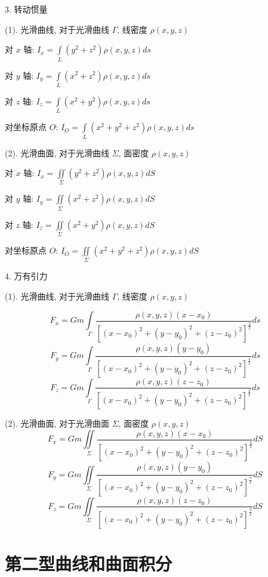 3. \textcolor{purplea}{转动惯量}
\begin{definition}[转动惯量: $I=mr^2$]
	
	(1). 光滑曲线, 对于光滑曲线 $\Gamma$, 线密度 $\rho(x,y,z)$
	
	对 $x$ 轴: $I_{x}=\int\limits_{L}(y^2+z^2)\rho(x,y,z)ds$
	
	对 $y$ 轴: $I_{y}=\int\limits_{L}(x^2+z^2)\rho(x,y,z)ds$
	
	对 $z$ 轴: $I_{z}=\int\limits_{L}(x^2+y^2)\rho(x,y,z)ds$
	
	对坐标原点 $O$: $I_{O}=\int\limits_{L}(x^2+y^2+z^2)\rho(x,y,z)ds$
	
	(2). 光滑曲面, 对于光滑曲线 $\Sigma$, 面密度 $\rho(x,y,z)$
	
	对 $x$ 轴: $I_{x}=\iint\limits_{\Sigma}(y^2+z^2)\rho(x,y,z)dS$
	
	对 $y$ 轴: $I_{y}=\iint\limits_{\Sigma}(x^2+z^2)\rho(x,y,z)dS$
	
	对 $z$ 轴: $I_{z}=\iint\limits_{\Sigma}(x^2+y^2)\rho(x,y,z)dS$
	
	对坐标原点 $O$: $I_{O}=\iint\limits_{\Sigma}(x^2+y^2+z^2)\rho(x,y,z)dS$
	
\end{definition}

4. \textcolor{purpleb}{万有引力}
\begin{definition}[引力公式: $F=\dfrac{GMm}{r^2}$]	

	(1). 光滑曲线, 对于光滑曲线 $\Gamma$, 线密度 $\rho(x,y,z)$

	$$F_{x}=Gm\int\limits_{\Gamma}\dfrac{\rho(x,y,z)(x-x_{0})}{[(x-x_{0})^2+(y-y_{0})^2+(z-z_{0})^2]^{\frac{3}{2}}}ds$$
	$$F_{y}=Gm\int\limits_{\Gamma}\dfrac{\rho(x,y,z)(y-y_{0})}{[(x-x_{0})^2+(y-y_{0})^2+(z-z_{0})^2]^{\frac{3}{2}}}ds$$
	$$F_{z}=Gm\int\limits_{\Gamma}\dfrac{\rho(x,y,z)(z-z_{0})}{[(x-x_{0})^2+(y-y_{0})^2+(z-z_{0})^2]^{\frac{3}{2}}}ds$$
	
	(2). 光滑曲面, 对于光滑曲面 $\Sigma$, 面密度 $\rho(x,y,z)$
	$$F_{x}=Gm\iint\limits_{\Sigma}\dfrac{\rho(x,y,z)(x-x_{0})}{[(x-x_{0})^2+(y-y_{0})^2+(z-z_{0})^2]^{\frac{3}{2}}}dS$$
	$$F_{y}=Gm\iint\limits_{\Sigma}\dfrac{\rho(x,y,z)(y-y_{0})}{[(x-x_{0})^2+(y-y_{0})^2+(z-z_{0})^2]^{\frac{3}{2}}}dS$$
	$$F_{z}=Gm\iint\limits_{\Sigma}\dfrac{\rho(x,y,z)(z-z_{0})}{[(x-x_{0})^2+(y-y_{0})^2+(z-z_{0})^2]^{\frac{3}{2}}}dS$$
\end{definition}


\chapter{第二型曲线和曲面积分}

